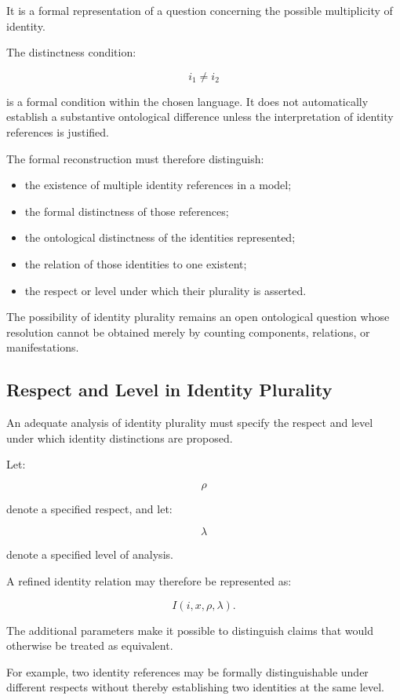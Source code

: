 It is a formal representation of
a question concerning the possible
multiplicity of identity.

The distinctness condition:

\[
    i_1 \neq i_2
\]

is a formal condition within the
chosen language. It does not
automatically establish a substantive
ontological difference unless the
interpretation of identity references
is justified.

The formal reconstruction must
therefore distinguish:

\begin{itemize}
    \item the existence of multiple
    identity references in a model;
    \item the formal distinctness of
    those references;
    \item the ontological distinctness
    of the identities represented;
    \item the relation of those identities
    to one existent;
    \item the respect or level under
    which their plurality is asserted.
\end{itemize}

The possibility of identity plurality
remains an open ontological question
whose resolution cannot be obtained
merely by counting components,
relations, or manifestations.

\subsection{Respect and Level in Identity Plurality}

An adequate analysis of identity
plurality must specify the respect
and level under which identity
distinctions are proposed.

Let:

\[
    \rho
\]

denote a specified respect, and let:

\[
    \lambda
\]

denote a specified level of analysis.

A refined identity relation may
therefore be represented as:

\[
    I(i,x,\rho,\lambda).
\]

The additional parameters make it
possible to distinguish claims that
would otherwise be treated as
equivalent.

For example, two identity references
may be formally distinguishable
under different respects without
thereby establishing two identities
at the same level.

